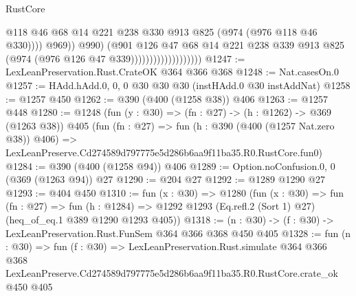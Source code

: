 \begin{lexlean}{RustCore}
\begin{coremodule}
                                              @118
                                              @46
                                              @68
                                              @14
                                              @221
                                              @238
                                              @330
                                              @913
                                              @825
                                              (@974 (@976 @118 @46 @330))))
                                          @969))
                                      @990)
                                    (@901
                                      @126
                                      @47
                                      @68
                                      @14
                                      @221
                                      @238
                                      @339
                                      @913
                                      @825
                                      (@974 (@976 @126 @47 @339)))))))))))))))))))
@1247 := LexLeanPreservation.Rust.CrateOK @364 @366 @368
@1248 := Nat.casesOn.{0}
@1257 := HAdd.hAdd.{0, 0, 0} @30 @30 @30 (instHAdd.{0} @30 instAddNat)
@1258 := @1257 @450
@1262 := @390 (@400 (@1258 @38)) @406
@1263 := @1257 @448
@1280 := @1248
    (fun (y : @30) => (fn : @27) -> (h : @1262) -> @369 (@1263 @38))
    @405
    (fun (fn : @27) =>
    fun (h : @390 (@400 (@1257 Nat.zero @38)) @406) =>
    LexLeanPreserve.Cd274589d797775e5d286b6aa9f11ba35.R0.RustCore.fun0)
@1284 := @390 (@400 (@1258 @94)) @406
@1289 := Option.noConfusion.{0, 0} (@369 (@1263 @94)) @27
@1290 := @204 @27
@1292 := @1289 @1290 @27
@1293 := @404 @450
@1310 := fun (x : @30) =>
  @1280
    (fun (x : @30) =>
    fun (fn : @27) =>
    fun (h : @1284) => @1292 @1293 (Eq.refl.{2} (Sort 1) @27) (heq_of_eq.{1} @389 @1290 @1293 @405))
@1318 := (n : @30) -> (f : @30) -> LexLeanPreservation.Rust.FunSem @364 @366 @368 @450 @405
@1328 := fun (n : @30) =>
  fun (f : @30) =>
  LexLeanPreservation.Rust.simulate
    @364
    @366
    @368
    LexLeanPreserve.Cd274589d797775e5d286b6aa9f11ba35.R0.RustCore.crate_ok
    @450
    @405
\end{coremodule}
\end{lexlean}
